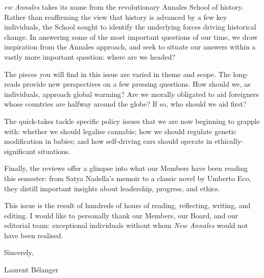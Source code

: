 
 \emph{ew Annales} takes its name from the revolutionary Annales School of history. Rather than reaffirming the view that history is advanced by a few key individuals, the School sought to identify the underlying forces driving historical change. In answering some of the most important questions of our time, we draw inspiration from the Annales approach, and seek to situate our answers within a vastly more important question: where are we headed?

The pieces you will find in this issue are varied in theme and scope. The long-reads provide new perspectives on a few pressing questions. How should we, as individuals, approach global warming? Are we morally obligated to aid foreigners whose countries are halfway around the globe? If so, who should we aid first? 

The quick-takes tackle specific policy issues that we are now beginning to grapple with: whether we should legalise cannabis; how we should regulate genetic modification in babies; and how self-driving cars should operate in ethically-significant situations.

Finally, the reviews offer a glimpse into what our Members have been reading this semester: from Satya Nadella's memoir to a classic novel by Umberto Eco, they distill important insights about leadership, progress, and ethics.

This issue is the result of hundreds of hours of reading, reflecting, writing, and editing. I would like to personally thank our Members, our Board, and our editorial team: exceptional individuals without whom \emph{New Annales} would not have been realised.

Sincerely,

Laurent B\'elanger 